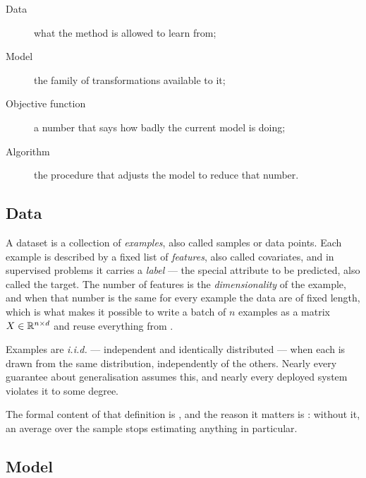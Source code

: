 \begin{description}
	\item[Data] what the method is allowed to learn from;
	\item[Model] the family of transformations available to it;
	\item[Objective function] a number that says how badly the current model is
	doing;
	\item[Algorithm] the procedure that adjusts the model to reduce that number.
\end{description}


\subsection{Data}

A dataset is a collection of \emph{examples}, also called samples or data
points. Each example is described by a fixed list of \emph{features}, also
called covariates, and in supervised problems it carries a \emph{label} --- the
special attribute to be predicted, also called the target. The number of
features is the \emph{dimensionality} of the example, and when that number is the
same for every example the data are of fixed length, which is what makes it
possible to write a batch of \(n\) examples as a matrix \(X\in\mathbb{R}^{n\times d}\) and
reuse everything from .

\begin{definition}
Examples are \emph{i.i.d.} --- independent and identically distributed ---
when each is drawn from the same distribution, independently of the others. Nearly every
guarantee about generalisation assumes this, and nearly every deployed system
violates it to some degree.
\end{definition}

The formal content of that definition is , and the reason it
matters is : without it, an average over the sample stops estimating
anything in particular.

\subsection{Model}

